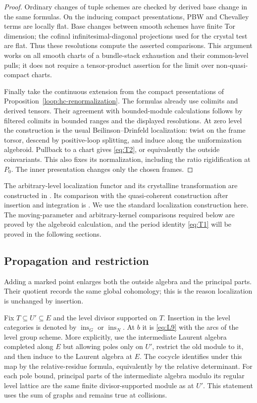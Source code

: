 \documentclass[11pt]{article}
\numberwithin{equation}{section}
\theoremstyle{definition}
\theoremstyle{remark}
\begin{document}
\begin{proof}
Ordinary changes of tuple schemes are checked by derived base change
in the same formulas.  On the inducing compact presentations, PBW and
Chevalley terms are locally flat.  Base changes between smooth schemes
have finite Tor dimension; the cofinal infinitesimal-diagonal
projections used for the crystal test are flat.  Thus these resolutions
compute the asserted comparisons.  This argument works on all smooth
charts of a bundle-stack exhaustion and their common-level pulls; it
does not require a tensor-product assertion for the limit over
non-quasi-compact charts.

Finally take the continuous extension from the compact presentations
of Proposition~\ref{loop:hc-renormalization}.  The formulas already use colimits and derived
tensors.  Their agreement with bounded-module calculations follows by
filtered colimits in bounded ranges and the displayed resolutions.
At zero level the construction is the usual Beilinson--Drinfeld
localization: twist on the frame torsor, descend by positive-loop
splitting, and induce along the uniformization algebroid.  Pullback to
a chart gives \eqref{eq:T2}, or equivalently the outside coinvariants.
This also fixes its normalization, including the ratio rigidification
at $P_0$.  The inner presentation changes only the chosen frames.
\end{proof}

The arbitrary-level localization functor and its crystalline
transformation are constructed in \cite[Section~12.1, especially
Equation~(12.4)]{GLCII}.  Its comparison with the quasi-coherent
construction after insertion and integration is
\cite[Theorems~12.1.5 and~12.1.8]{GLCII}.  We use the standard
localization construction here.  The moving-parameter and
arbitrary-kernel comparisons required below are proved by the
algebroid calculation, and the period identity \eqref{eq:T1} will be
proved in the following sections.

\subsection{Propagation and restriction}

Adding a marked point enlarges both the outside algebra and the
principal parts.  Their quotient records the same global cohomology;
this is the reason localization is unchanged by insertion.

Fix $T\subseteq U'\subseteq E$ and the level divisor supported on $T$.
Insertion in the level categories is denoted by
$\operatorname{ins}_G$ or $\operatorname{ins}_N$.  At $b$ it is
\eqref{eq:L9} with the arcs of the level group scheme.  More explicitly,
use the intermediate Laurent algebra completed along $E$ but allowing
poles only on $U'$, restrict the old module to it, and then induce to
the Laurent algebra at $E$.  The cocycle identifies under this map by
the relative-residue formula, equivalently by the relative determinant.
For each pole bound, principal parts of the intermediate algebra
modulo its regular level lattice are the same finite
divisor-supported module as at $U'$.  This statement uses the sum of
graphs and remains true at collisions.
\end{document}
